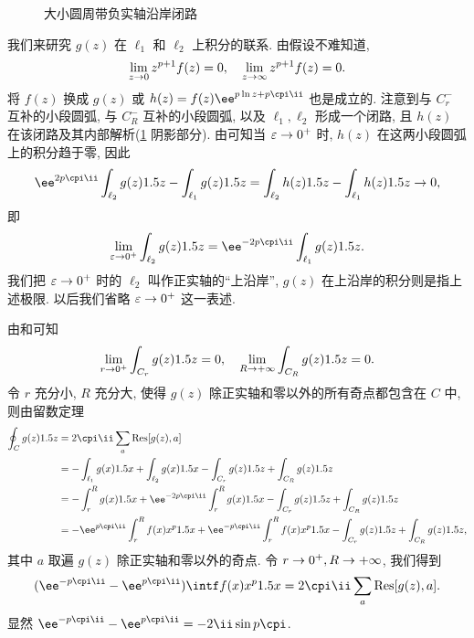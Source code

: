 \begin{figure}[H]
  \centering
  \caption{大小圆周带负实轴沿岸闭路}
  \label{fig:large-small-circle-negative-side}
\end{figure}

我们来研究 $g(z)$ 在 $\ell_1$ 和 $\ell_2$ 上积分的联系.
由假设不难知道,
\[
  \lim_{z\rightarrow 0} z^{p+1}f(z)=0,\quad
  \lim_{z\rightarrow \infty} z^{p+1}f(z)=0.
\]
将 $f(z)$ 换成 $g(z)$ 或 $h(z)=f(z)\ee^{p\ln z+p\cpi\ii}$ 也是成立的.
注意到与 $C_r^-$ 互补的小段圆弧, 与 $C_R^-$ 互补的小段圆弧, 以及 $\ell_1,\ell_2$ 形成一个闭路, 且 $h(z)$ 在该闭路及其内部解析(\ref{fig:large-small-circle-negative-side} 阴影部分).
由\thmsa 可知当 $\varepsilon\rightarrow0^+$ 时, $h(z)$ 在这两小段圆弧上的积分趋于零, 因此
\[
  \ee^{2p\cpi\ii}\int_{\ell_2} g(z)\d z-\int_{\ell_1} g(z)\d z
  =\int_{\ell_2} h(z)\d z-\int_{\ell_1} h(z)\d z
  \ra 0,
\]
即
\[
  \lim_{\varepsilon\ra 0^+}\int_{\ell_2} g(z)\d z
  =\ee^{-2p\cpi\ii}\int_{\ell_1} g(z)\d z.
\]
我们把 $\varepsilon\rightarrow 0^+$ 时的 $\ell_2$ 叫作正实轴的``上沿岸'', $g(z)$ 在上沿岸的积分则是指上述极限.
以后我们省略 $\varepsilon\rightarrow 0^+$ 这一表述.

由\thmsa 和\thmSA 可知
\[
  \lim_{r\rightarrow0^+}\int_{C_r} g(z)1.5 z=0,\quad
  \lim_{R\rightarrow+\infty}\int_{C_R} g(z)1.5 z=0.
\]
令 $r$ 充分小, $R$ 充分大, 使得 $g(z)$ 除正实轴和零以外的所有奇点都包含在 $C$ 中, 则由留数定理
\begin{align*}
   \oint_C g(z)\d z&
  =2\cpi\ii\sum_a \Res[g(z),a]\\&
  =-\int_{\ell_1} g(x)\d x
    +\int_{\ell_2} g(x)\d x
    -\int_{C_r}g(z)\d z
    +\int_{C_R}g(z)\d z\\&
  =-\int_r^R g(x)\d x
    +\ee^{-2p\cpi\ii}\int_r^R g(x)\d x
    -\int_{C_r}g(z)\d z
    +\int_{C_R}g(z)\d z\\&
  =-\ee^{p\cpi\ii}\int_r^R f(x)x^p\d x
    +\ee^{-p\cpi\ii}\int_r^R f(x)x^p\d x
    -\int_{C_r}g(z)\d z
    +\int_{C_R}g(z)\d z,
\end{align*}
其中 $a$ 取遍 $g(z)$ 除正实轴和零以外的奇点.
令 $r\rightarrow0^+,R\rightarrow +\infty$, 我们得到
\[
   (\ee^{-p\cpi\ii}-\ee^{p\cpi\ii})\intf f(x)x^p\d x
  =2\cpi\ii\sum_a \Res[g(z),a].
\]
显然 $\ee^{-p\cpi\ii}-\ee^{p\cpi\ii}=-2\ii\sin{p\cpi}$.

